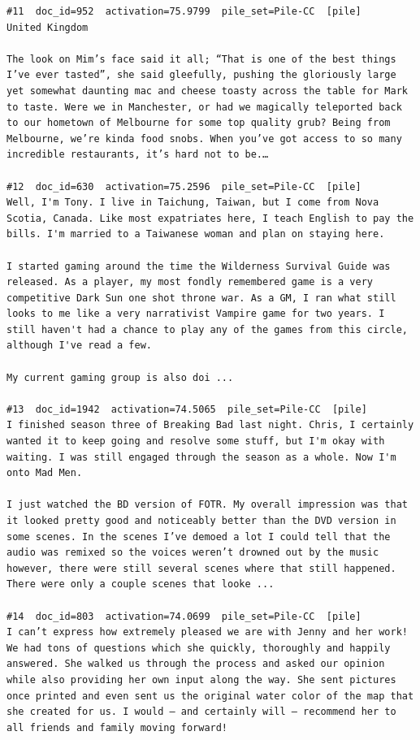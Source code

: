 \begin{verbatim}
#11  doc_id=952  activation=75.9799  pile_set=Pile-CC  [pile]
United Kingdom

The look on Mim’s face said it all; “That is one of the best things I’ve ever tasted”, she said gleefully, pushing the gloriously large yet somewhat daunting mac and cheese toasty across the table for Mark to taste. Were we in Manchester, or had we magically teleported back to our hometown of Melbourne for some top quality grub? Being from Melbourne, we’re kinda food snobs. When you’ve got access to so many incredible restaurants, it’s hard not to be.…

#12  doc_id=630  activation=75.2596  pile_set=Pile-CC  [pile]
Well, I'm Tony. I live in Taichung, Taiwan, but I come from Nova Scotia, Canada. Like most expatriates here, I teach English to pay the bills. I'm married to a Taiwanese woman and plan on staying here.

I started gaming around the time the Wilderness Survival Guide was released. As a player, my most fondly remembered game is a very competitive Dark Sun one shot throne war. As a GM, I ran what still looks to me like a very narrativist Vampire game for two years. I still haven't had a chance to play any of the games from this circle, although I've read a few.

My current gaming group is also doi ...

#13  doc_id=1942  activation=74.5065  pile_set=Pile-CC  [pile]
I finished season three of Breaking Bad last night. Chris, I certainly wanted it to keep going and resolve some stuff, but I'm okay with waiting. I was still engaged through the season as a whole. Now I'm onto Mad Men.

I just watched the BD version of FOTR. My overall impression was that it looked pretty good and noticeably better than the DVD version in some scenes. In the scenes I’ve demoed a lot I could tell that the audio was remixed so the voices weren’t drowned out by the music however, there were still several scenes where that still happened. There were only a couple scenes that looke ...

#14  doc_id=803  activation=74.0699  pile_set=Pile-CC  [pile]
I can’t express how extremely pleased we are with Jenny and her work! We had tons of questions which she quickly, thoroughly and happily answered. She walked us through the process and asked our opinion while also providing her own input along the way. She sent pictures once printed and even sent us the original water color of the map that she created for us. I would — and certainly will — recommend her to all friends and family moving forward!


\end{verbatim}

